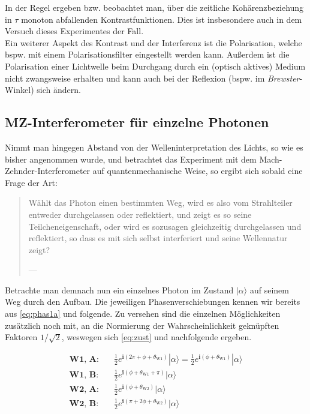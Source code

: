 \documentclass[numbers=noenddot,a4paper,notitlepage,twoside,BCOR15mm]{scrartcl}
\newcommand{\ix}[1]{_\text{#1}}
\newcommand{\imag}{\mathbf{i}}
\newcommand{\tilt}[1]{\textit{#1}}
\newcommand{\fett}[1]{\textbf{#1}}
\newcommand{\ket}[1]{|#1\rangle}
\begin{document}
			In der Regel \cite{MZcohe} ergeben bzw. beobachtet man, über die zeitliche Kohärenzbeziehung in $\tau$ monoton abfallenden Kontrastfunktionen. Dies ist insbesondere auch in dem Versuch dieses Experimentes der Fall.\\
			Ein weiterer Aspekt des Kontrast und der Interferenz ist die Polarisation, welche bspw. mit einem Polarisationsfilter eingestellt werden kann. Außerdem ist die Polarisation einer Lichtwelle beim Durchgang durch ein (optisch aktives) Medium nicht zwangsweise erhalten und kann auch bei der Reflexion (bspw. im \tilt{Brewster}-Winkel) sich ändern. 

			\subsection{MZ-Interferometer für einzelne Photonen}

				Nimmt man hingegen Abstand von der Welleninterpretation des Lichts, so wie es bisher angenommen wurde, und betrachtet das Experiment mit dem Mach-Zehnder-Interferometer auf quantenmechanische Weise, so ergibt sich sobald eine Frage der Art:

					\begin{quote}
						Wählt das Photon einen bestimmten Weg, wird es also vom Strahlteiler entweder durchgelassen oder reflektiert, und zeigt es so seine Teilcheneigenschaft, oder wird es sozusagen gleichzeitig durchgelassen und reflektiert, so dass es mit sich selbst interferiert und seine Wellennatur zeigt? \par\raggedleft ---
					\end{quote}

				Betrachte man demnach nun ein einzelnes Photon im Zustand $\ket{\alpha}$ auf seinem Weg durch den Aufbau. Die jeweiligen Phasenverschiebungen kennen wir bereits aus \autoref{eq:phas1a} und folgende. Zu versehen sind die einzelnen Möglichkeiten zusätzlich noch mit, an die Normierung der Wahrscheinlichkeit geknüpften Faktoren $1/\sqrt{2}$, weswegen sich \autoref{eq:zust} und nachfolgende ergeben.

					\begin{align}
						\fett{W1, A:}&\quad \frac{1}{2}e^{\imag(2\pi+\phi+\theta\ix{W1})}\ket{\alpha}=\frac{1}{2}e^{\imag(\phi+\theta\ix{W1})}\ket{\alpha} \label{eq:zust} \\
						\fett{W1, B:}&\quad \frac{1}{2}e^{\imag(\phi+\theta\ix{W1}+\pi)}\ket{\alpha} \\
						\fett{W2, A:}&\quad \frac{1}{2}e^{\imag(\phi+\theta\ix{W2})}\ket{\alpha} \\
						\fett{W2, B:}&\quad \frac{1}{2}e^{\imag(\pi+2\phi+\theta\ix{W2})}\ket{\alpha}
					\end{align}
\end{document}
